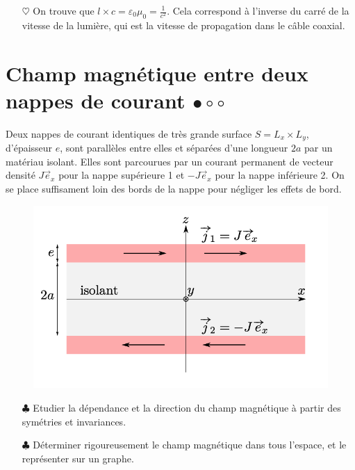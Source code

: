 \documentclass{report}
\begin{document}
\begin{itemize}
	\item[$\heartsuit$] On trouve que $l\times c=\varepsilon_0\mu_0=\frac{1}{c^2}$. Cela correspond à l'inverse du carré de la vitesse de la lumière, qui est la vitesse de propagation dans le câble coaxial.
	
\end{itemize}

\newpage

\section*{Champ magnétique entre deux nappes de courant $\bullet\circ\circ$}

Deux nappes de courant identiques de très grande surface $S = L_x\times L_y$, d’épaisseur $e$, sont parallèles entre elles et séparées d’une longueur $2a$ par un matériau isolant. Elles sont parcourues par un courant permanent de vecteur densité $J\vec{e}_x$ pour la nappe supérieure 1 et $-J\vec{e}_x$ pour la nappe inférieure 2. On se place suffisament loin des bords de la nappe pour négliger les effets de bord.

\begin{figure}[h!]
\centering
		\includegraphics[scale=0.7]{nappe_courant.png}
\end{figure}

\begin{itemize}
	
	\item[$\clubsuit$] Etudier la dépendance et la direction du champ magnétique à partir des symétries et invariances.
	
	\item[$\clubsuit$] Déterminer rigoureusement le champ magnétique dans tous l'espace, et le représenter sur un graphe.
	
\end{itemize}
\end{document}
